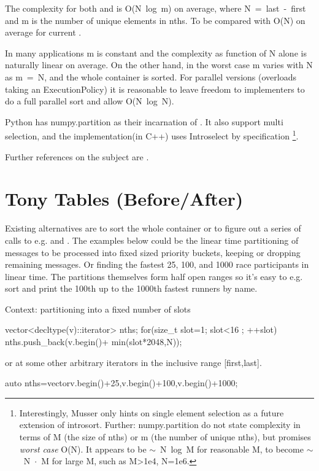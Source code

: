 The complexity for both  and  is \mbox{O(N log m)} on average, where \mbox{N = last - first} and m is the number of unique elements in nths. To be compared with \mbox{O(N)} on average for current . 

In many applications m is constant and the complexity as function of N alone is naturally linear on average. On the other hand, in the worst case m varies with N as \mbox{m = N}, and the whole container is sorted. For parallel versions (overloads taking an ExecutionPolicy) it is reasonable to leave freedom to implementers to do a full parallel sort and allow \mbox{O(N log N)}.

Python has numpy.partition\cite{NpPart} as their incarnation of . 
It also support multi selection, and the implementation\cite{NPImpl}(in C++) uses \mbox{Introselect\cite{Musser1997}} by specification%
\footnote{Interestingly, Musser only hints on single element selection as a future extension of introsort. 
Further: numpy.partition do not state complexity in terms of M (the size of nths) or m (the number of unique nths), 
but promises \emph{worst case} O(N). It appears to be \mbox{$\sim$ N log M} for reasonable M, 
to become \mbox{$\sim$ N $\cdot$ M} for large M, such as M>1e4, N=1e6. }.

Further references on the subject are \cite{Kaligosi2006,Panh2002}.

\newpage
\section{Tony Tables (Before/After)}

Existing alternatives are to sort the whole container or to figure out a series of calls to e.g.  and . 
The examples below could be the linear time partitioning of messages to be
processed into fixed sized priority buckets, keeping or dropping remaining messages. Or finding the fastest 25, 100, and 1000 race participants in linear time. 
The partitions themselves form half open ranges so it's easy to e.g. sort and
print the 100th up to the 1000th fastest runners by name. 

Context: partitioning into a fixed number of slots
\begin{codeblock}
vector<decltype(v)::iterator> nths;
for(size_t slot=1; slot<16 ; ++slot){
	nths.push_back(v.begin()+ min(slot*2048,N));
}
\end{codeblock}
or at some other arbitrary iterators in the inclusive range [first,last].
\begin{codeblock}
auto nths=vector{v.begin()+25,v.begin()+100,v.begin()+1000}; 
\end{codeblock}

